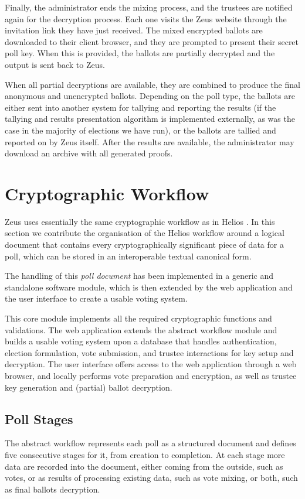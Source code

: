 \documentclass[letterpaper,10pt]{article}
\begin{document}
Finally, the administrator ends the mixing process,
and the trustees are notified again for the decryption process.
Each one visits the Zeus website through the invitation link they have
just received.
The mixed encrypted ballots are downloaded to their client browser,
and they are prompted to present their secret poll key.
When this is provided, the ballots are partially decrypted 
and the output is sent back to Zeus.

When all partial decryptions are available, they are combined to produce
the final anonymous and unencrypted ballots.
Depending on the poll type, the ballots are either sent into another
system for tallying and reporting the results (if the tallying
and results presentation algorithm is implemented externally, as was
the case in the majority of elections we have run),
or the ballots are tallied and reported on by Zeus itself.
After the results are available,
the administrator may download an archive with all generated proofs.

\section{Cryptographic Workflow}
\label{sec:crypto_workflow}

Zeus uses essentially the same cryptographic workflow as in Helios
\cite{adida:2008}.
In this section we contribute the organisation of the Helios workflow
around a logical document that contains every cryptographically
significant piece of data for a poll,
which can be stored in an interoperable textual canonical form.

The handling of this \emph{poll document} has been implemented
in a generic and standalone software module, which is then extended by
the web application and the user interface to create a usable voting system.

This core module implements all the required cryptographic functions and
validations. The web application extends the abstract workflow module
and builds a usable voting system upon a database
that handles authentication, election formulation, vote submission,
and trustee interactions for key setup and decryption.
The user interface offers access to the web application through
a web browser, and locally performs vote preparation and encryption,
as well as trustee key generation and (partial) ballot decryption.

\subsection{Poll Stages}
The abstract workflow represents each poll as a structured document
and defines five consecutive stages for it, from creation to completion.
At each stage more data are recorded into the document,
either coming from the outside, such as votes,
or as results of processing existing data, such as vote mixing,
or both, such as final ballots decryption.
\end{document}
